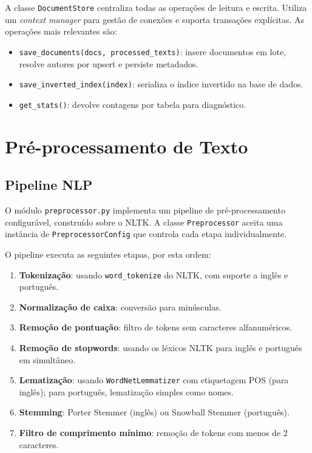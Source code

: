 \documentclass[12pt,a4paper]{article}
\begin{document}
A classe \texttt{DocumentStore} centraliza todas as operações de leitura e escrita. Utiliza um \emph{context manager} para gestão de conexões e suporta transações explícitas. As operações mais relevantes são:

\begin{itemize}
    \item \texttt{save\_documents(docs, processed\_texts)}: insere documentos em lote, resolve autores por upsert e persiste metadados.
    \item \texttt{save\_inverted\_index(index)}: serializa o índice invertido na base de dados.
    \item \texttt{get\_stats()}: devolve contagens por tabela para diagnóstico.
\end{itemize}

\section{Pré-processamento de Texto}

\subsection{Pipeline NLP}

O módulo \texttt{preprocessor.py} implementa um pipeline de pré-processamento configurável, construído sobre o NLTK. A classe \texttt{Preprocessor} aceita uma instância de \texttt{PreprocessorConfig} que controla cada etapa individualmente.

O pipeline executa as seguintes etapas, por esta ordem:

\begin{enumerate}
    \item \textbf{Tokenização}: usando \texttt{word\_tokenize} do NLTK, com suporte a inglês e português.
    \item \textbf{Normalização de caixa}: conversão para minúsculas.
    \item \textbf{Remoção de pontuação}: filtro de tokens sem caracteres alfanuméricos.
    \item \textbf{Remoção de stopwords}: usando os léxicos NLTK para inglês e português em simultâneo.
    \item \textbf{Lematização}: usando \texttt{WordNetLemmatizer} com etiquetagem POS (para inglês); para português, lematização simples como nomes.
    \item \textbf{Stemming}: Porter Stemmer (inglês) ou Snowball Stemmer (português).
    \item \textbf{Filtro de comprimento mínimo}: remoção de tokens com menos de 2 caracteres.
\end{enumerate}
\end{document}
